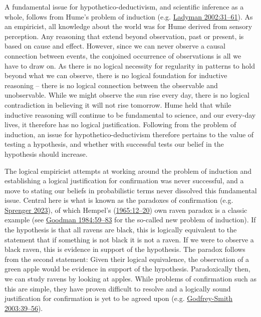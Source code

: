 \documentclass[
  12pt,
  a4paper,
  oneside]{book}
\begin{document}
A fundamental issue for hypothetico-deductivism, and scientific inference as a whole, follows from Hume's problem of induction (e.g. \protect\hyperlink{ref-ladyman2002}{Ladyman 2002:31--61}). As an empiricist, all knowledge about the world was for Hume derived from sensory perception. Any reasoning that extend beyond observation, past or present, is based on cause and effect. However, since we can never observe a causal connection between events, the conjoined occurrence of observations is all we have to draw on. As there is no logical necessity for regularity in patterns to hold beyond what we can observe, there is no logical foundation for inductive reasoning -- there is no logical connection between the observable and unobservable. While we might observe the sun rise every day, there is no logical contradiction in believing it will not rise tomorrow. Hume held that while inductive reasoning will continue to be fundamental to science, and our every-day lives, it therefore has no logical justification. Following from the problem of induction, an issue for hypothetico-deductivism therefore pertains to the value of testing a hypothesis, and whether with successful tests our belief in the hypothesis should increase.

The logical empiricist attempts at working around the problem of induction and establishing a logical justification for confirmation was never successful, and a move to stating our beliefs in probabilistic terms never dissolved this fundamental issue. Central here is what is known as the paradoxes of confirmation (e.g. \protect\hyperlink{ref-sprenger2023}{Sprenger 2023}), of which Hempel's (\protect\hyperlink{ref-hempel1965}{1965:12--20}) own raven paradox is a classic example (see \protect\hyperlink{ref-goodman1983}{Goodman 1984:59--83} for the so-called new problem of induction). If the hypothesis is that all ravens are black, this is logically equivalent to the statement that if something is not black it is not a raven. If we were to observe a black raven, this is evidence in support of the hypothesis. The paradox follows from the second statement: Given their logical equivalence, the observation of a green apple would be evidence in support of the hypothesis. Paradoxically then, we can study ravens by looking at apples. While problems of confirmation such as this are simple, they have proven difficult to resolve and a logically sound justification for confirmation is yet to be agreed upon (e.g. \protect\hyperlink{ref-godfrey-smith2003}{Godfrey-Smith 2003:39--56}).
\end{document}

